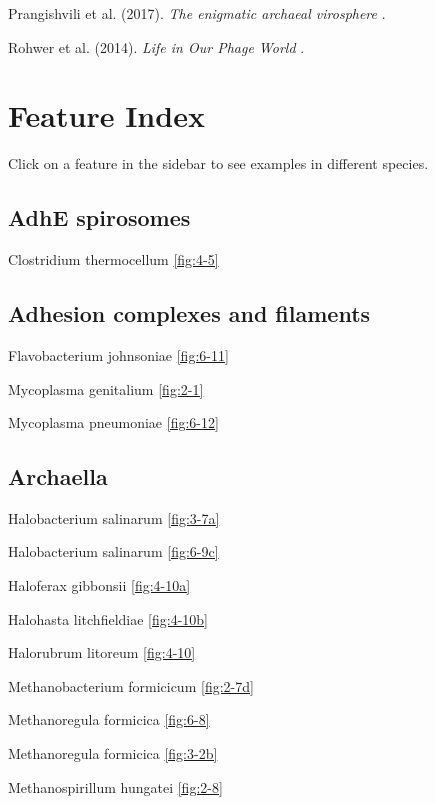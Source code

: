 \documentclass[]{tufte-book}
\begin{document}
Prangishvili et al. (2017). \emph{The enigmatic archaeal virosphere}
\citep{prangishvili2017}.

Rohwer et al. (2014). \emph{Life in Our Phage World} \citep{rohwer2014}.

\appendix


\chapter{Feature Index}\label{feature-index}

Click on a feature in the sidebar to see examples in different species.

\section*{AdhE spirosomes}\label{adhe-spirosomes}

Clostridium thermocellum \ref{fig:4-5}

\section*{Adhesion complexes and
filaments}\label{adhesion-complexes-and-filaments}

Flavobacterium johnsoniae \ref{fig:6-11}

Mycoplasma genitalium \ref{fig:2-1}

Mycoplasma pneumoniae \ref{fig:6-12}

\section*{Archaella}\label{archaella}

Halobacterium salinarum \ref{fig:3-7a}

Halobacterium salinarum \ref{fig:6-9c}

Haloferax gibbonsii \ref{fig:4-10a}

Halohasta litchfieldiae \ref{fig:4-10b}

Halorubrum litoreum \ref{fig:4-10}

Methanobacterium formicicum \ref{fig:2-7d}

Methanoregula formicica \ref{fig:6-8}

Methanoregula formicica \ref{fig:3-2b}

Methanospirillum hungatei \ref{fig:2-8}
\end{document}
